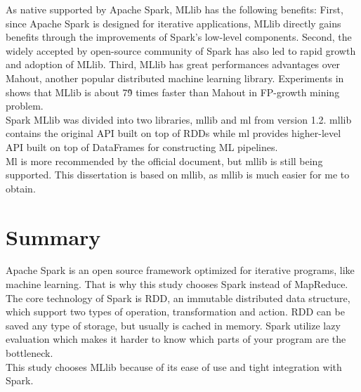 As native supported by Apache Spark, MLlib has the following benefits\cite{meng2016mllib}: First, since Apache Spark is designed for iterative applications, MLlib directly gains benefits through the improvements of Spark's low-level components. Second, the widely accepted by open-source community of Spark has also led to rapid growth and adoption of MLlib. Third, MLlib has great performances advantages over Mahout, another popular distributed machine learning library. Experiments in \cite{1_li_jiang_zhang_boesch_xiao_2015} shows that MLlib is about 7\~9 times faster than Mahout in FP-growth mining problem.\\


Spark MLlib was divided into two libraries, mllib and ml from version 1.2. mllib contains the original API built on top of RDDs while ml provides higher-level API built on top of DataFrames for constructing ML pipelines.\\


Ml is more recommended by the official document, but mllib is still being supported. This dissertation is based on mllib, as mllib is much easier for me to obtain.


\section{Summary}
Apache Spark is an open source framework optimized for iterative programs, like machine learning. That is why this study chooses Spark instead of MapReduce.\\


The core technology of Spark is RDD, an immutable distributed data structure, which support two types of operation, transformation and action. RDD can be saved any type of storage, but usually is cached in memory. Spark utilize lazy evaluation which makes it harder to know which parts of your program are the bottleneck.\\


This study chooses MLlib because of its ease of use and tight integration with Spark.


